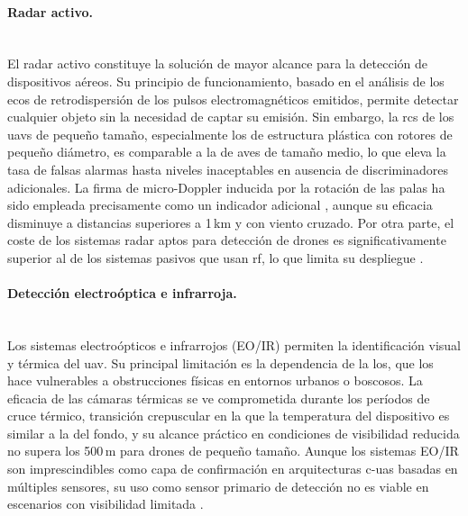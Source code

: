 \paragraph{Radar activo.}\mbox{}\\[0.5em] El radar activo constituye la solución de mayor alcance para la detección de dispositivos aéreos. Su principio de funcionamiento, basado en el análisis de los ecos de retrodispersión de los pulsos electromagnéticos emitidos, permite detectar cualquier objeto sin la necesidad de captar su emisión. Sin embargo, la \gls{rcs} de los \glspl{uav} de pequeño tamaño, especialmente los de estructura plástica con rotores de pequeño diámetro, es comparable a la de aves de tamaño medio, lo que eleva la tasa de falsas alarmas hasta niveles inaceptables en ausencia de discriminadores adicionales. La firma de micro-Doppler inducida por la rotación de las palas ha sido empleada precisamente como un indicador adicional \cite{martelli_exploitation_2020}, aunque su eficacia disminuye a distancias superiores a 1\,km y con viento cruzado. Por otra parte, el coste de los sistemas radar aptos para detección de drones es significativamente superior al de los sistemas pasivos que usan \gls{rf}, lo que limita su despliegue \cite{semkin_analyzing_2020}.

\paragraph{Detección electroóptica e infrarroja.}\mbox{}\\[0.5em] Los sistemas electroópticos e infrarrojos (EO/IR) permiten la identificación visual y térmica del \gls{uav}. Su principal limitación es la dependencia de la \gls{los}, que los hace vulnerables a obstrucciones físicas en entornos urbanos o boscosos. La eficacia de las cámaras térmicas se ve comprometida durante los períodos de cruce térmico, transición crepuscular en la que la temperatura del dispositivo es similar a la del fondo, y su alcance práctico en condiciones de visibilidad reducida no supera los 500\,m para drones de pequeño tamaño. Aunque los sistemas EO/IR son imprescindibles como capa de confirmación en arquitecturas \gls{c-uas} basadas en múltiples sensores, su uso como sensor primario de detección no es viable en escenarios con visibilidad limitada \cite{salhi_design_2025}.

